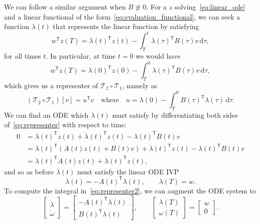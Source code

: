 \documentclass{article}
\begin{document}
We can follow a similar argument when $B \not \equiv 0$. For a $z$
solving~\eqref{eq:linear_ode} and a linear functional of the
form~\eqref{eq:evaluation_functional}, we can seek a function $\lambda(t)$
that represents the linear function by satisfying
\begin{equation}
    w^\mathsf{T} z(T) = \lambda(t)^\mathsf{T} z(t) - \int_T^t \lambda(\tau)^\mathsf{T} B(\tau) v \, \mathrm{d} \tau,
    \label{eq:representer}
\end{equation}
for all times $t$. In particular, at time $t=0$ we would have
\begin{equation}
    w^\mathsf{T} z(T) = \lambda(0)^\mathsf{T} z(0) - \int_T^0 \lambda(\tau)^\mathsf{T} B(\tau) v \, \mathrm{d} \tau,
\end{equation}
which gives us a representer of $\mathcal{T}_2 \circ \mathcal{T}_1$, namely as
\begin{equation}
    (\mathcal{T}_2 \circ \mathcal{T}_1)[v] = u^\mathsf{T} v
    \quad \text{where} \quad
    u = \lambda(0) - \int_T^0 B(\tau)^\mathsf{T} \lambda(\tau) \, \mathrm{d} \tau.
    \label{eq:representer2}
\end{equation}
We can find an ODE which $\lambda(t)$ must satisfy by
differentiating both sides of~\eqref{eq:representer} with respect to time:
\begin{align}
    0 &= \lambda(t)^\mathsf{T} \dot z(t) + \dot \lambda(t)^\mathsf{T} z(t) - \lambda(t)^\mathsf{T} B(t) v
    \\
    &=
    \lambda(t)^\mathsf{T} \left( A(t) z(t) + B(t) v \right) + \dot \lambda(t)^\mathsf{T} z(t) - \lambda(t)^\mathsf{T} B(t) v
    \\
    &= \lambda(t)^\mathsf{T} A(t) z(t) + \dot \lambda(t)^\mathsf{T} z(t),
\end{align}
and so as before $\lambda(t)$ must satisfy the linear ODE IVP
\begin{equation}
    \dot \lambda(t) = -A(t)^\mathsf{T} \lambda(t), \qquad \lambda(T) = w.
\end{equation}
To compute the integral in~\eqref{eq:representer2}, we can augment the ODE
system to
\begin{equation}
    \begin{bmatrix}
        \dot \lambda \\
        \dot \omega
    \end{bmatrix}
    =
    \begin{bmatrix}
        - A(t)^\mathsf{T} \lambda(t)
        \\
        B(t)^\mathsf{T} \lambda(t)
    \end{bmatrix},
    \qquad
    \begin{bmatrix}
        \lambda(T) \\
        \omega(T)
    \end{bmatrix}
    =
    \begin{bmatrix}
        w \\
        0
    \end{bmatrix}.
\end{equation}
\end{document}
